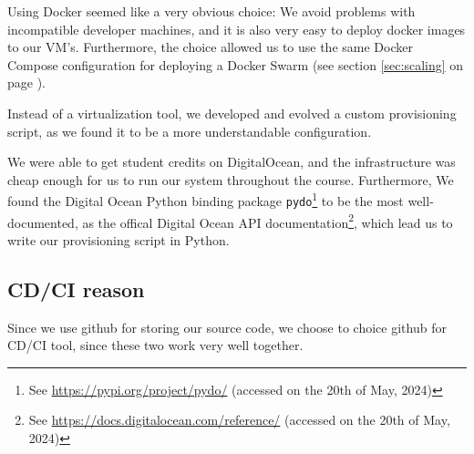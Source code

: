 Using Docker seemed like a very obvious choice: We avoid problems with incompatible developer machines, and it is also very easy to deploy docker images to our VM's. Furthermore,
the choice allowed us to use the same Docker Compose configuration for deploying a Docker Swarm (see section \ref{sec:scaling} on page \pageref{sec:scaling}).

Instead of a virtualization tool, we developed and evolved a custom provisioning script, as we found it to be a more understandable configuration.%


We were able to get student credits on DigitalOcean, and the infrastructure was cheap enough for us to run our system throughout the course.
Furthermore, We found the Digital Ocean Python binding package \texttt{pydo}\footnote{See \url{https://pypi.org/project/pydo/} (accessed on the 20th of May, 2024)} to be the most well-documented, as the offical Digital Ocean API documentation\footnote{See \url{https://docs.digitalocean.com/reference/} (accessed on the 20th of May, 2024)}, which lead us to write our provisioning script in Python.


\subsection{CD/CI reason}
Since we use github for storing our source code, we choose to choice github for CD/CI tool, since these two work very well together.

